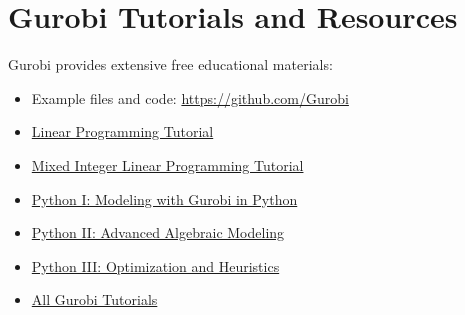 \section{Gurobi Tutorials and Resources}

Gurobi provides extensive free educational materials:

\begin{itemize}
\item Example files and code: \url{https://github.com/Gurobi}
\item \href{https://www.gurobi.com/resource/mathematical-programming-tutorial-linear-programming/}{Linear Programming Tutorial}
\item \href{https://www.gurobi.com/resource/tutorial-mixed-integer-linear-programming/}{Mixed Integer Linear Programming Tutorial}
\item \href{https://www.gurobi.com/resource/python-i-webinar/}{Python I: Modeling with Gurobi in Python}
\item \href{https://www.gurobi.com/resource/python-ii-webinar/}{Python II: Advanced Algebraic Modeling}
\item \href{https://www.gurobi.com/resource/python-iii-webinar/}{Python III: Optimization and Heuristics}
\item \href{https://www.gurobi.com/resources/?category-filter=tutorials}{All Gurobi Tutorials}
\end{itemize}

